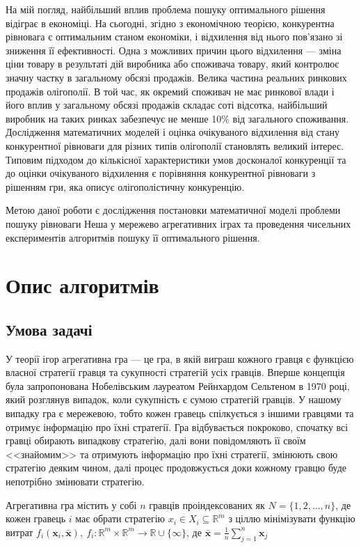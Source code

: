 \documentclass[a4paper]{article}
\begin{document}
На мій погляд, найбільший вплив проблема пошуку оптимального рішення відіграє в економіці. На сьогодні, згідно з економічною теорією, конкурентна рівновага є оптимальним станом економіки, і відхилення від нього пов'язано зі зниження її ефективності. Одна з можливих причин цього відхилення — зміна ціни товару в результаті дій виробника або споживача товару, який контролює значну частку в загальному обсязі продажів. Велика частина реальних ринкових продажів олігополії. В той час, як окремий споживач не має ринкової влади і його вплив у загальному обсязі продажів складає соті відсотка, найбільший виробник на таких ринках забезпечує не менше 10\% від загального споживання. Дослідження математичних моделей і оцінка очікуваного відхилення від стану конкурентної рівноваги для різних типів олігополії становлять великий інтерес. Типовим підходом до кількісної характеристики умов досконалої конкуренції та до оцінки очікуваного відхилення є порівняння конкурентної рівноваги з рішенням гри, яка описує олігополістичну конкуренцію.

Метою даної роботи є дослідження постановки математичної моделі проблеми пошуку рівноваги Неша у мережево агрегативних іграх та проведення чисельних експериментів алгоритмів пошуку її оптимального рішення.


\clearpage

\section{Опис алгоритмів}
\subsection{Умова задачі}
У теорії ігор агрегативна гра — це гра, в якій виграш кожного гравця є функцією власної стратегії гравця та сукупності стратегій усіх гравців. Вперше концепція була запропонована Нобелівським лауреатом Рейнхардом Сельтеном в 1970 році, який розглянув випадок, коли сукупність є сумою стратегій гравців. У нашому випадку гра є мережевою, тобто кожен гравець спілкується з іншими гравцями та отримує інформацію про їхні стратегії. Гра відбувається покроково, спочатку всі гравці обирають випадкову стратегію, далі вони повідомляють її своїм <<знайомим>> та отримують інформацію про їхні стратегії, змінюють свою стратегію деяким чином, далі процес продовжується доки кожному гравцю буде непотрібно змінювати стратегію.

Агрегативна гра містить у собі $n$ гравців проіндексованих як $N = \{1, 2, ... , n\}$, де кожен гравець $i$ має обрати стратегію $x_i \in X_i \subseteq \mathbb{R}^m$ з ціллю мінімізувати функцію витрат $f_i (\mathbf{x}_i, \mathbf{\bar{x}}),~f_i: \mathbb{R}^m \times \mathbb{R}^m \rightarrow \mathbb{R} \cup \{ \infty \}$, де $\mathbf{\bar{x}} = \frac{1}{n} \sum_{j=1}^{n} \mathbf{x}_j$
\end{document}
